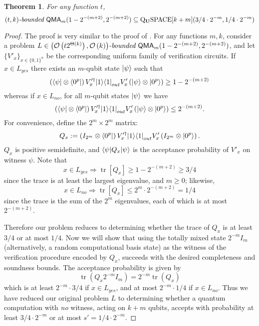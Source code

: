 \documentclass[11pt]{article}
\newtheorem{theorem}{Theorem}
\theoremstyle{definition}
\theoremstyle{remark}
\newcommand\QMA{{\sf{QMA}}}
\newcommand\PSPACE{{\sf{PSPACE}}}
\newcommand\bddQMA[5]{{\left(#1,#2\right)}\textit{-bounded }\QMA_{#3}(#4,#5)}
\newcommand{\classfont}{\mathrm}
\newcommand{\Unitary}{\mathbf{U}}
\newcommand{\unitaryQSPACE}[3]{\classfont{Q}_\Unitary\classfont{SPACE}[#1](#2,#3)}
\DeclareMathOperator{\tr}{tr}
\begin{document}
\begin{theorem} \label{thm:pqpspace simulation} For any function $t$,
\[
\bddQMA{t}{k}{m}{1-2^{-(m+2)}}{2^{-(m+2)}}\subseteq
\unitaryQSPACE{k+m}{3/4\cdot 2^{-m}}{1/4 \cdot 2^{-m}}
\]
\end{theorem}
\begin{proof}
The proof is very similar to the proof of \cite[Theorem 3.6]{mw05}. For any functions $m, k$, consider a problem $L\in\bddQMA{\mathcal{O}\left(t2^{\Theta(k)}\right)}{\mathcal{O}\left(k\right)}{m}{1-2^{-(m+2)}}{2^{-(m+2)}}$, and let $\{V'_x\}_{x\in\{0,1\}^n}$ be the corresponding uniform family of verification circuits.
If $x\in L_{yes}$ there exists an $m$-qubit state ${\left\vert{\psi}\right\rangle}$ such that
\begin{equation}
\left({\left\langle{\psi}\right\vert}\otimes {\left\langle{0^p}\right\vert}\right) V'^\dagger_x {\left\vert{1}\right\rangle}{\left\langle{1}\right\vert}_{out} V'_x \left({\left\vert{\psi}\right\rangle}\otimes {\left\vert{0^p}\right\rangle}\right) \ge 1-2^{-(m+2)}
\end{equation}
whereas if $x \in L_{no}$, for all $m$-qubit states ${\left\vert{\psi}\right\rangle}$ we have
\begin{equation}
\left({\left\langle{\psi}\right\vert}\otimes {\left\langle{0^p}\right\vert}\right) V'^\dagger_x {\left\vert{1}\right\rangle}{\left\langle{1}\right\vert}_{out} V'_x \left({\left\vert{\psi}\right\rangle}\otimes {\left\vert{0^p}\right\rangle}\right) \le 2^{-(m+2)}.
\end{equation}
For convenience, define the $2^m \times 2^m$ matrix:
\begin{equation}
Q_x := \left(I_{2^m}\otimes {\left\langle{0^p}\right\vert}\right) V'^\dagger_x {\left\vert{1}\right\rangle}{\left\langle{1}\right\vert}_{out} V'_x \left(I_{2^m}\otimes {\left\vert{0^p}\right\rangle}\right).
\end{equation}
$Q_x$ is positive semidefinite, and ${\left\langle{\psi}\right\vert}Q_x{\left\vert{\psi}\right\rangle}$ is the acceptance probability of $V'_x$ on witness $\psi$.
Note that
\begin{equation}
x\in L_{yes} \Rightarrow \tr[Q_x]\ge 1 - 2^{-(m+2)} \ge 3/4
\end{equation}
since the trace is at least the largest eigenvalue, and $m\geq 0$; likewise,
\begin{equation}
x\in L_{no} \Rightarrow \tr[Q_x]\le 2^m \cdot 2^{-(m+2)} = 1/4
\end{equation}
since the trace is the sum of the $2^m$ eigenvalues, each of which is at most $2^{-(m+2)}$. 

Therefore our problem reduces to determining whether the trace of $Q_x$ is at least $3/4$ or at most $1/4$.  Now we will show that using the totally mixed state $2^{-m}I_m$ (alternatively, a random computational basis state) as the witness of the verification procedure encoded by $Q_x$, succeeds with the desired completeness and soundness bounds.  The acceptance probability is given by
\begin{equation}
\tr(Q_x 2^{-m}I_m) = 2^{-m} \tr(Q_x)
\end{equation}
which is at least $2^{-m} \cdot 3/4$ if $x\in L_{yes}$, and at most $2^{-m} \cdot 1/4$ if $x\in L_{no}$. Thus we have reduced our original problem $L$ to determining whether a quantum computation with \emph{no} witness, acting on $k+m$ qubits, accepts with probability at least $3/4 \cdot 2^{-m}$ or at most $s'=1/4 \cdot 2^{-m}$.


\end{proof}
\end{document}
